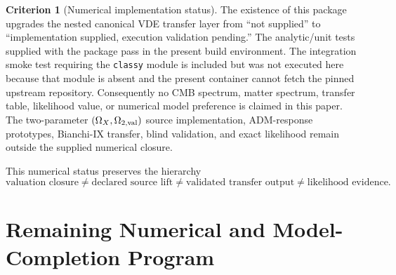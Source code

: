 \documentclass[11pt,a4paper]{article}
\numberwithin{equation}{section}
\theoremstyle{definition}
\newtheorem{criterion}{Criterion}
\theoremstyle{plain}
\theoremstyle{remark}
\begin{document}
\begin{criterion}[Numerical implementation status]
\label{crit:numerical-implementation-status}
The existence of this package upgrades the nested canonical VDE transfer layer
from ``not supplied'' to ``implementation supplied, execution validation
pending.''  The analytic/unit tests supplied with the package pass in the
present build environment.  The integration smoke test requiring the
\texttt{classy} module is included but was not executed here because that
module is absent and the present container cannot fetch the pinned upstream
repository.  Consequently no CMB spectrum, matter spectrum, transfer table,
likelihood value, or numerical model preference is claimed in this paper.
The two-parameter \((\Omega_X,\Omega_{2,{\rm val}})\) source implementation,
ADM-response prototypes, Bianchi-IX transfer, blind validation, and exact
likelihood remain outside the supplied numerical closure.
\end{criterion}

This numerical status preserves the hierarchy
\begin{equation}
\boxed{
\text{valuation closure}\neq\text{declared source lift}
\neq\text{validated transfer output}\neq\text{likelihood evidence}.}
\end{equation}

\section{Remaining Numerical and Model-Completion Program}
\label{sec:remaining-program}
\end{document}
